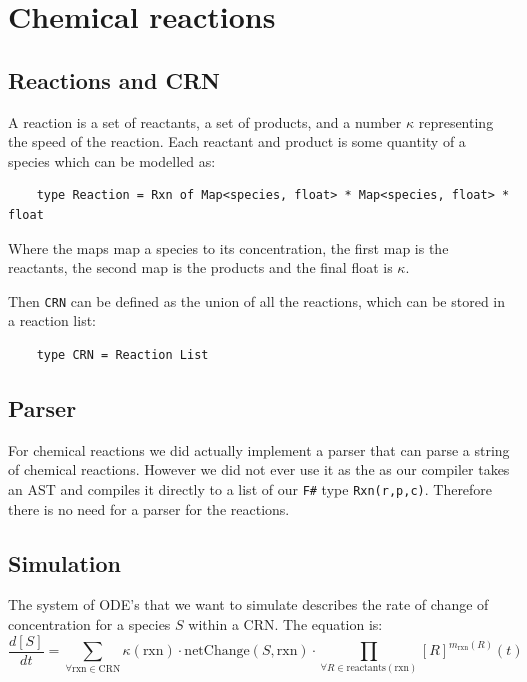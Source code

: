 \section{Chemical reactions}

\subsection{Reactions and CRN}
A reaction is a set of reactants, a set of products, and a number $\kappa$ representing the speed of the reaction. Each reactant and product is some quantity of a species which can be modelled as:  
\begin{verbatim}
    type Reaction = Rxn of Map<species, float> * Map<species, float> * float
\end{verbatim}
Where the maps map a species to its concentration, the first map is the reactants, the second map is the products and the final float is $\kappa$.

Then \texttt{CRN} can be defined as the union of all the reactions, which can be stored in a reaction list:
\begin{verbatim}
    type CRN = Reaction List
\end{verbatim}

\subsection{Parser}

For chemical reactions we did actually implement a parser that can parse a string of chemical reactions. However we did not ever use it as the as our compiler takes an AST and compiles it directly to a list of our \texttt{F\#} type \texttt{Rxn(r,p,c)}. Therefore there is no need for a parser for the reactions. %

\subsection{Simulation}
The system of ODE's that we want to simulate describes the rate of change of concentration for a species \( S \) within a CRN. The equation is:
\begin{equation}\label{eq:diff}
    \frac{d[S]}{dt} = \sum_{\forall \text{rxn} \in \text{CRN}} \kappa(\text{rxn}) \cdot \text{netChange}(S,\text{rxn}) \cdot \prod_{\forall R \in \text{reactants}(\text{rxn})} [R]^{m_{\text{rxn}}(R)}(t)
\end{equation}

